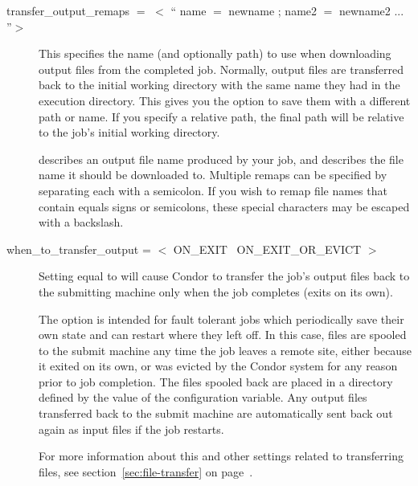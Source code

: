 \begin{description}
\item[transfer\_output\_remaps $=$ $<$ `` name $=$ newname ; name2 $=$ newname2 ... ''$>$ ]
This specifies the name (and optionally path) to use when downloading output
files from the completed job.  Normally, output files are transferred back
to the initial working directory with the same name they had in the execution
directory.  This gives you the option to save them with a different path
or name.  If you specify a relative path, the final path will be relative
to the job's initial working directory.

 describes an output file name produced by your job, and
 describes the file name it should be downloaded to.
Multiple remaps can be specified by separating each with a semicolon.
If you wish to remap file names that contain equals signs or
semicolons, these special characters may be escaped with a backslash.



\item[when\_to\_transfer\_output = $<$ ON\_EXIT \Bar\ ON\_EXIT\_OR\_EVICT $>$] 

Setting  equal to  will
cause Condor to transfer the job's output files back to the submitting
machine only when the job completes (exits on its own).

The  option is intended for fault tolerant
jobs which periodically save their own state and can restart where
they left off.
In this case, files are spooled to the submit machine any time the
job leaves a remote site, either because it exited on its own, or was
evicted by the Condor system for any reason prior to job completion.
The files spooled back are placed in a directory defined by
the value of the  configuration variable.
Any output files transferred back to the submit machine are
automatically sent back out again as input files if the job restarts.

For more information about this and other settings related to
transferring files, see section~\ref{sec:file-transfer} on
page~\pageref{sec:file-transfer}.

\end{description} 

